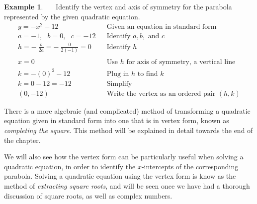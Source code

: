 \documentclass[12pt]{book}
\theoremstyle{definition}
\newtheorem{example}{Example}
\begin{document}
\begin{example}~~~Identify the vertex and axis of symmetry for the parabola represented by the given quadratic equation.
\begin{eqnarray*}
y=-x^2-12      &  & \text{Given an equation in standard form}\\ 
a=-1,~~~b=0,~~~c=-12       &  & \text{Identify~} a,b, \text{~and~} c\\             
h=-~\frac{b}{2a}=-~\frac{0}{2(-1)}=0 & & \text{Identify~} h\\
& & \\
x=0 & & \text{Use~} h \text{~for~axis~of~symmetry,~a~vertical~line}\\
k= -(0)^2-12   &  & \text{Plug in~} h \text{~to~find~} k\\
k= 0-12= -12  &  &\mathrm{Simplify}\\
(0,-12)    &  & \text{Write the vertex as an ordered pair $(h,k)$}
\end{eqnarray*}
\end{example}
There is a more algebraic (and complicated) method of transforming a quadratic equation given in standard form into one that is in vertex form, known as {\it completing the square}.  This method will be explained in detail towards the end of the chapter.\par
We will also see how the vertex form can be particularly useful when solving a quadratic equation, in order to identify the $x$-intercepts of the corresponding parabola.  Solving a quadratic equation using the vertex form is know as the method of {\it extracting square roots}, and will be seen once we have had a thorough discussion of square roots, as well as complex numbers. 
\end{document}
